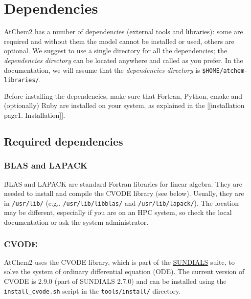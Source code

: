 \section{Dependencies} \label{sec:dependencies}

AtChem2 has a number of dependencies (external tools and libraries):
some are required and without them the model cannot be installed or
used, others are optional. We suggest to use a single directory for all
the dependencies; the \emph{dependencies directory} can be located
anywhere and called as you prefer. In the documentation, we will assume
that the \emph{dependencies directory} is
\texttt{\$HOME/atchem-libraries/}.

Before installing the dependencies, make sure that Fortran, Python,
cmake and (optionally) Ruby are installed on your system, as explained
in the {[}{[}installation page\textbar{}1. Installation{]}{]}.

\hypertarget{required-dependencies}{%
\subsection{Required dependencies}\label{required-dependencies}}

\hypertarget{blas-and-lapack}{%
\subsubsection{BLAS and LAPACK}\label{blas-and-lapack}}

BLAS and LAPACK are standard Fortran libraries for linear algebra. They
are needed to install and compile the CVODE library (see below).
Usually, they are in \texttt{/usr/lib/} (e.g.,
\texttt{/usr/lib/libblas/} and \texttt{/usr/lib/lapack/}). The location
may be different, especially if you are on an HPC system, so check the
local documentation or ask the system administrator.

\hypertarget{cvode}{%
\subsubsection{CVODE}\label{cvode}}

AtChem2 uses the CVODE library, which is part of the
\href{https://computation.llnl.gov/projects/sundials}{SUNDIALS} suite,
to solve the system of ordinary differential equation (ODE). The current
version of CVODE is 2.9.0 (part of SUNDIALS 2.7.0) and can be installed
using the \texttt{install\_cvode.sh} script in the
\texttt{tools/install/} directory.

